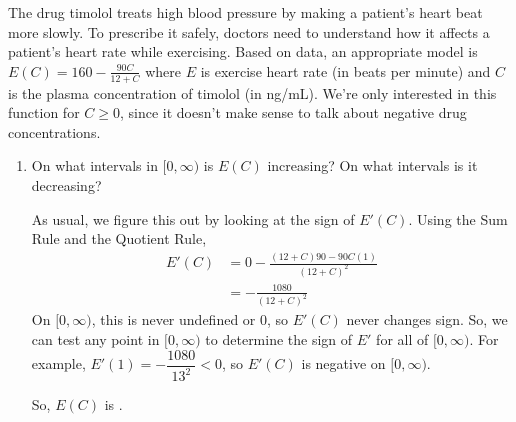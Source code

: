\documentclass{article}
\makeatletter
\let\@href=\href
\renewcommand{\href}[2]{\@href{#1}{\ul{#2}}}
\let\@uhref=\href
\let\@autocites=\autocites
\renewcommand{\autocites}[2]{
  \let\href=\@href
  \@autocites{#1}{#2}
  \let\href=\@uhref
}
\theoremstyle{theorem}
\makeatother
\begin{document}
\begin{enumerate}
  The drug timolol treats high blood pressure by making a patient's heart beat more slowly. To prescribe it safely, doctors need to understand how it affects a patient's heart rate while exercising. Based on data, an appropriate model is $\displaystyle E(C) = 160 - \frac{90C}{12 + C}$ where $E$ is exercise heart rate (in beats per minute) and $C$ is the plasma concentration of timolol (in ng/mL)\solonly{\autocites{RefWorks:12}{Holford1982143}}. We're only interested in this function for $C \geq 0$, since it doesn't make sense to talk about negative drug concentrations.

  \begin{enumerate}
  \item
    \begin{problem}[\vfill]
      On what intervals in $[0, \infty)$ is $E(C)$ increasing? On what intervals is it decreasing?
    \end{problem}

    \begin{solution}
      As usual, we figure this out by looking at the sign of $E'(C)$. Using the Sum Rule and the Quotient Rule,
      \begin{align*}
        E'(C) &= 0 - \frac{(12 + C) 90 - 90C (1)}{(12 + C)^2} \\
        &= - \frac{1080}{(12 + C)^2}
      \end{align*}
      On $[0, \infty)$, this is never undefined or 0, so $E'(C)$ never changes sign. So, we can test any point in $[0, \infty)$ to determine the sign of $E'$ for all of $[0, \infty)$. For example, $E'(1) = - \dfrac{1080}{13^2} < 0$, so $E'(C)$ is negative on $[0, \infty)$.
      \begin{center}
      \end{center}
      So, $E(C)$ is \fbox{decreasing on $[0, \infty)$}.
    \end{solution}


\end{enumerate}
\end{enumerate}
\end{document}
